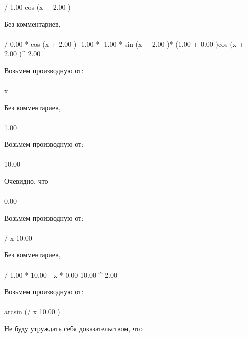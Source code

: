 \begin{}
/ {1.00 }{cos (x + 2.00 )}\\
\end{}
Без комментариев, 
\begin{gather}
\end{gather}
\begin{}
/ {0.00 * cos (x + 2.00 )- 1.00 * -1.00 * sin (x + 2.00 )* (1.00 + 0.00 )}{cos (x + 2.00 )^ {2.00 }}\\
\end{}
Возьмем производную от:
\begin{gather}
\end{gather}
\begin{}
x \\
\end{}
Без комментариев, 
\begin{gather}
\end{gather}
\begin{}
1.00 \\
\end{}
Возьмем производную от:
\begin{gather}
\end{gather}
\begin{}
10.00 \\
\end{}
Очевидно, что
\begin{gather}
\end{gather}
\begin{}
0.00 \\
\end{}
Возьмем производную от:
\begin{gather}
\end{gather}
\begin{}
/ {x }{10.00 }\\
\end{}
Без комментариев, 
\begin{gather}
\end{gather}
\begin{}
/ {1.00 * 10.00 - x * 0.00 }{10.00 ^ {2.00 }}\\
\end{}
Возьмем производную от:
\begin{gather}
\end{gather}
\begin{}
arcsin (/ {x }{10.00 })\\
\end{}
Не буду утруждать себя доказательством, что
\begin{gather}
\end{gather}
